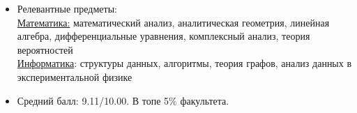 \begin{itemize}
\item Релевантные предметы: \\
	\underline{Математика:} математический анализ, аналитическая геометрия, линейная алгебра, дифференциальные уравнения, комплексный анализ, теория вероятностей\\
	\underline{Информатика}: структуры данных, алгоритмы, теория графов, анализ данных в экспериментальной физике  \\
\item Средний балл: 9.11/10.00. В топе 5\% факультета.
\end{itemize}
